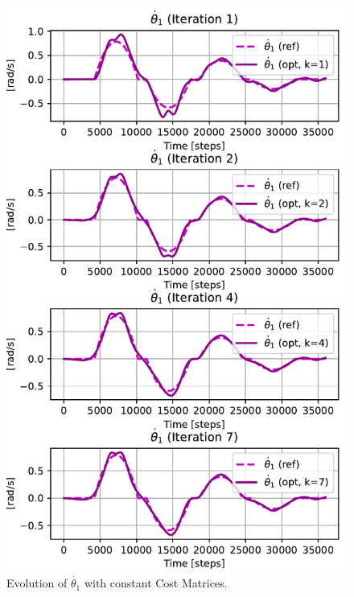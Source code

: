 \begin{figure}[htb]
    \centering
    \includegraphics[width=0.9\linewidth]{img/2-task2/t1d_const.pdf}
    \caption{Evolution of $\dot{\theta_1}$ with constant Cost Matrices.}
    \label{fig:th1dot_const_}
\end{figure}

